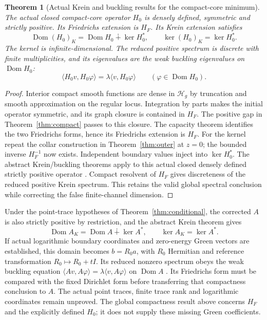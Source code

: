 \documentclass[11pt]{article}
\theoremstyle{readable}
\newtheorem{theorem}{Theorem}[section]
\theoremstyle{remark}\newtheorem{remark}[theorem]{Remark}
\newcommand{\Dom}{\operatorname{Dom}}\newcommand{\spec}{\operatorname{spec}}
\begin{document}
\begin{theorem}[Actual Krein and buckling results for the compact-core minimum]
The actual closed compact-core operator $H_0$ is densely defined, symmetric
and strictly positive. Its Friedrichs extension is $H_F$.
Its Krein extension satisfies
\[
 \Dom(H_0)_K=\Dom H_0\dotplus\ker H_0^*,\qquad
 \ker(H_0)_K=\ker H_0^*.
\]
The kernel is infinite-dimensional. The reduced positive spectrum is
discrete with finite multiplicities, and its eigenvalues are the weak
buckling eigenvalues on $\Dom H_0$:
\[
 \langle H_0v,H_0\varphi\rangle
 =\lambda\langle v,H_0\varphi\rangle\qquad(\varphi\in\Dom H_0).
\]
\end{theorem}
\begin{proof}
Interior compact smooth functions are dense in $\mathcal H_g$ by truncation
and smooth approximation on the regular locus. Integration by parts makes
the initial operator symmetric, and its graph closure is contained in
$H_F$. The positive gap in Theorem~\ref{thm:compact} passes to this closure.
The capacity theorem identifies the two Friedrichs forms, hence its
Friedrichs extension is $H_F$.
For the kernel repeat the collar construction in
Theorem~\ref{thm:outer} at $z=0$; the bounded inverse $H_F^{-1}$ now
exists. Independent boundary values inject into $\ker H_0^*$.
The abstract Krein/buckling theorems apply to this actual closed densely
defined strictly positive operator \cite[Hypothesis 2.2, Theorem 2.4 and
Theorem 3.4]{buckling}. Compact resolvent of $H_F$ gives discreteness of
the reduced positive Krein spectrum. This retains the valid global spectral
conclusion while correcting the false finite-channel dimension.
\end{proof}

Under the point-trace hypotheses of Theorem~\ref{thm:conditional}, the
corrected $A$ is also strictly positive by restriction, and the abstract
Krein theorem gives
\[
 \Dom A_K=\Dom A\dotplus\ker A^*,\qquad\ker A_K=\ker A^*.
\]
If actual logarithmic boundary coordinates and zero-energy Green vectors
are established, this domain becomes $b=R_0a$, with $R_0$ Hermitian and
reference transformation $R_0\mapsto R_0+tI$. Its reduced nonzero
spectrum obeys the weak buckling equation
$\langle Av,A\varphi\rangle=\lambda\langle v,A\varphi\rangle$ on
$\Dom A$ \cite{krein,buckling}. Its Friedrichs form must be compared with
the fixed Dirichlet form before transferring that compactness conclusion to
$A$. The actual point traces, finite trace rank and logarithmic coordinates
remain unproved. The global compactness result above concerns $H_F$ and the
explicitly defined $H_0$; it does not supply these missing Green coefficients.
\end{document}
